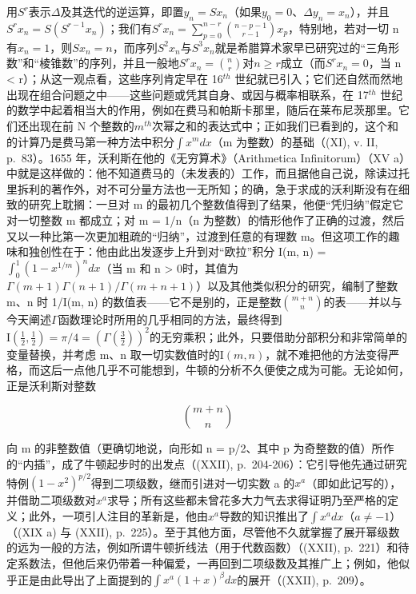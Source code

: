 用\(S^{r}\)表示\(\Delta\)及其迭代的逆运算，即置\(y_{n} = Sx_{n}\)（如果\(y_{0} = 0\)、\(\Delta y_{n} = x_{n}\)），并且\(S^{r}x_{n} = S\left(S^{r-1}x_{n}\right)\)；我们有\(S^{r}x_{n} = \sum_{p=0}^{n-r} \binom{n-p-1}{r-1} x_{p}\)，特别地，若对一切 n 有\(x_{n} = 1\)，则\(Sx_{n} = n\)，而序列\(S^{2}x_{n}\)与\(S^{3}x_{n}\)就是希腊算术家早已研究过的“三角形数”和“棱锥数”的序列，并且一般地\(S^{r}x_{n} = \binom{n}{r}\)对\(n \geqslant r\)成立（而\(S^{r}x_{n} = 0\)，当 n \textless{} r）；从这一观点看，这些序列肯定早在 16\(^{th}\) 世纪就已引入；它们还自然而然地出现在组合问题之中——这些问题或凭其自身、或因与概率相联系，在 17\(^{th}\) 世纪的数学中起着相当大的作用，例如在费马和帕斯卡那里，随后在莱布尼茨那里。它们还出现在前 N 个整数的\(m^{th}\)次幂之和的表达式中；正如我们已看到的，这个和的计算乃是费马第一种方法中积分\(\int x^{m} dx\)（m 为整数）的基础（(XI), v. II, p.~83）。1655 年，沃利斯在他的《无穷算术》（Arithmetica Infinitorum）（XV a）中就是这样做的：他不知道费马的（未发表的）工作，而且据他自己说，除读过托里拆利的著作外，对不可分量方法也一无所知；的确，急于求成的沃利斯没有在细致的研究上耽搁：一旦对 m 的最初几个整数值得到了结果，他便“凭归纳”假定它对一切整数 m 都成立；对 m = 1/n（n 为整数）的情形他作了正确的过渡，然后又以一种比第一次更加粗疏的“归纳”，过渡到任意的有理数 m。但这项工作的趣味和独创性在于：他由此出发逐步上升到对“欧拉”积分 I(m, n) = \(\int_{0}^{1}(1 - x^{1/m})^{n} dx\)（当 m 和 n \textgreater{} 0时，其值为\(\Gamma(m+1)\Gamma(n+1)/\Gamma(m+n+1)\)）以及其他类似积分的研究，编制了整数 m、n 时 1/I(m, n) 的数值表——它不是别的，正是整数\(\binom{m+n}{n}\)的表——并以与今天阐述\(\varGamma\)函数理论时所用的几乎相同的方法，最终得到\(\mathrm{I}(\frac{1}{2},\frac{1}{2})=\pi/4=\left(\varGamma(\frac{3}{2})\right)^{2}\)的无穷乘积；此外，只要借助分部积分和非常简单的变量替换，并考虑 m、n 取一切实数值时的\(\mathrm{I}(m,n)\)，就不难把他的方法变得严格，而这后一点他几乎不可能想到，牛顿的分析不久便使之成为可能。无论如何，正是沃利斯对整数

\[
\binom{m + n}{n}
\]

向 m 的非整数值（更确切地说，向形如 n = p/2、其中 p 为奇整数的值）所作的“内插”，成了牛顿起步时的出发点（(XXII), p.~204-206）：它引导他先通过研究特例\((1 - x^{2})^{p/2}\)得到二项级数，继而引进对一切实数 a 的\(x^{a}\)（即如此记写的），并借助二项级数对\(x^{a}\)求导；所有这些都未曾花多大力气去求得证明乃至严格的定义；此外，一项引人注目的革新是，他由\(x^{a}\)导数的知识推出了\(\int x^{a} dx\)（\(a \neq -1\)）（(XIX a) 与 (XXII), p.~225）。至于其他方面，尽管他不久就掌握了展开幂级数的远为一般的方法，例如所谓牛顿折线法（用于代数函数）（(XXII), p.~221）和待定系数法，但他后来仍带着一种偏爱，一再回到二项级数及其推广上；例如，他似乎正是由此导出了上面提到的\(\int x^{a}(1 + x)^{\beta} dx\)的展开（(XXII), p.~209）。

